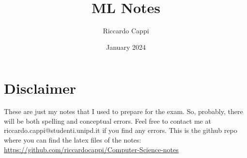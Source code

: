 \documentclass{extbook}
\title{ML Notes}
\author{Riccardo Cappi}
\date{January 2024}
\begin{document}
\maketitle

\section{Disclaimer}
These are just my notes that I used to prepare for the exam. So, probably, there will be both spelling and conceptual errors. Feel free to contact me at riccardo.cappi@studenti.unipd.it if you find any errors. This is the github repo where you can find the latex files of the notes: \url{https://github.com/riccardocappi/Computer-Science-notes}

\tableofcontents



















\end{document}
